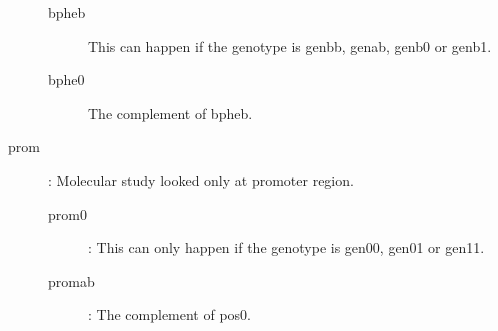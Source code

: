 \documentclass[a4paper]{article}
\begin{document}
\begin{description}
    \begin{description}
        \item[bpheb] This can happen if the genotype is genbb, genab, genb0 or genb1.
        \item[bphe0] The complement of bpheb. 
    \end{description}
    \item[prom]: Molecular study looked only at promoter region.
    \begin{description}
        \item[prom0]: This can only happen if the genotype is gen00, gen01 or gen11.
        \item[promab]: The complement of pos0.
    \end{description}
\end{description}
\end{document}
